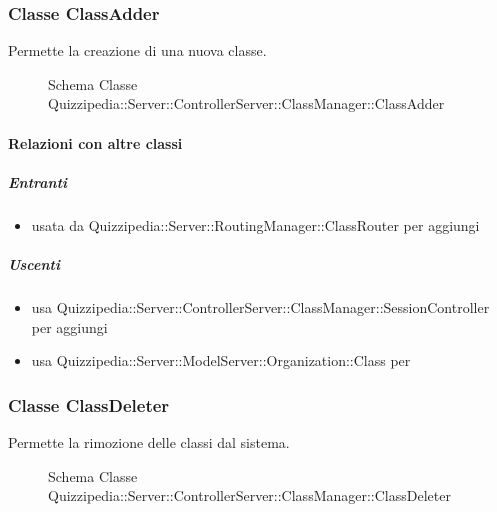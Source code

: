 \subsubsection{Classe ClassAdder}
Permette la creazione di una nuova classe.
\begin{figure}[H]
\centering
\noindent{}
\caption[Schema Classe ClassAdder]{Schema Classe Quizzipedia::Server::ControllerServer::ClassManager::ClassAdder}
\end{figure}
\paragraph{Relazioni con altre classi}
\subparagraph{Entranti}
\begin{itemize}
\item usata da Quizzipedia::Server::RoutingManager::ClassRouter per aggiungi
\end{itemize}
\subparagraph{Uscenti}
\begin{itemize}
\item usa Quizzipedia::Server::ControllerServer::ClassManager::SessionController per aggiungi
\item usa Quizzipedia::Server::ModelServer::Organization::Class per 
\end{itemize}
\subsubsection{Classe ClassDeleter}
Permette la rimozione delle classi dal sistema.
\begin{figure}[H]
\centering
\noindent{}
\caption[Schema Classe ClassDeleter]{Schema Classe Quizzipedia::Server::ControllerServer::ClassManager::ClassDeleter}
\end{figure}
